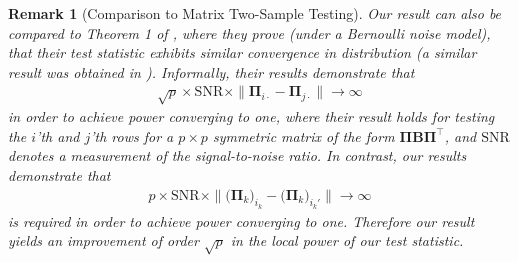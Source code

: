 \documentclass[10pt]{article}
\newcommand{\0}{{\mathbf{0}}}
\newcommand{\1}{{\mathbf{1}}}
\renewcommand{\citet}{\cite}
\renewcommand{\t}{^{\top}}
\newtheorem{remark}{Remark}
\renewcommand{\tilde}{\widetilde}
\begin{document}
\begin{remark}[Comparison to  Matrix Two-Sample Testing]
Our result can also be compared to Theorem 1 of \citet{fan_simple_2022}, where they prove (under a Bernoulli noise model), that their test statistic exhibits similar convergence in distribution (a similar result was obtained in \citet{du_hypothesis_2022}). Informally, their results demonstrate that 
\begin{align*}
    \sqrt{p}  \times  \mathrm{SNR} \times \| \mathbf{\Pi}_{i\cdot} - \mathbf{\Pi}_{j\cdot} \| \to \infty
\end{align*}
in order to achieve power converging to one, where their result holds for testing the $i$'th and $j$'th rows for a $p\times p$ symmetric matrix of the form $\mathbf{\Pi} \mathbf{B} \mathbf{\Pi}\t$, and $\mathrm{SNR}$ denotes a measurement of the signal-to-noise ratio.  In contrast, our results demonstrate that
\begin{align*}
    p \times \mathrm{SNR} \times \| \big(\mathbf{\Pi}_k\big)_{i_k} - \big(\mathbf{\Pi}_k\big)_{i_k'} \| \to \infty
\end{align*}
is required 
in order to achieve power converging to one.  Therefore our result yields an improvement of order $\sqrt{p}$ in the local power of our test statistic.  
\end{remark}




%
\end{document}
